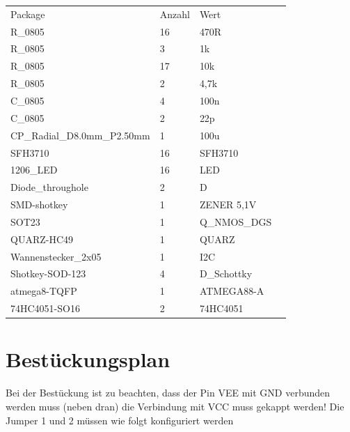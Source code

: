\documentclass{article}
\begin{document}
\begin{minipage}[t]{\textwidth}
	\begin{tabular}{llll}
		Package                             & Anzahl & Wert  &     \\
		R\_0805                             & 16       & 470R         &     \\
		R\_0805                             & 3        & 1k           &     \\
		R\_0805                             & 17       & 10k          &     \\
		R\_0805                             & 2        & 4,7k       &     \\
		C\_0805                             & 4        & 100n         &     \\
		C\_0805                             & 2        & 22p          &     \\
		CP\_Radial\_D8.0mm\_P2.50mm & 1        & 100u         &     \\
		SFH3710                             & 16       & SFH3710      &     \\
		1206\_LED                           & 16       & LED          &     \\
		Diode\_throughole                   & 2        & D            &     \\
		SMD-shotkey                         & 1        & ZENER 5,1V   &     \\
		SOT23                               & 1        & Q\_NMOS\_DGS &     \\
		QUARZ-HC49                          & 1        & QUARZ        &     \\
		Wannenstecker\_2x05                 & 1        & I2C          &     \\
		Shotkey-SOD-123                     & 4        & D\_Schottky  &     \\
		atmega8-TQFP                        & 1        & ATMEGA88-A   &     \\
		74HC4051-SO16                       & 2        & 74HC4051     &    
	\end{tabular}
\end{minipage}

\section{Bestückungsplan}

Bei der Bestückung ist zu beachten, dass der Pin VEE mit GND verbunden werden muss (neben dran)
die Verbindung mit VCC muss gekappt werden! Die Jumper 1 und 2 müssen wie folgt konfiguriert werden
\end{document}
